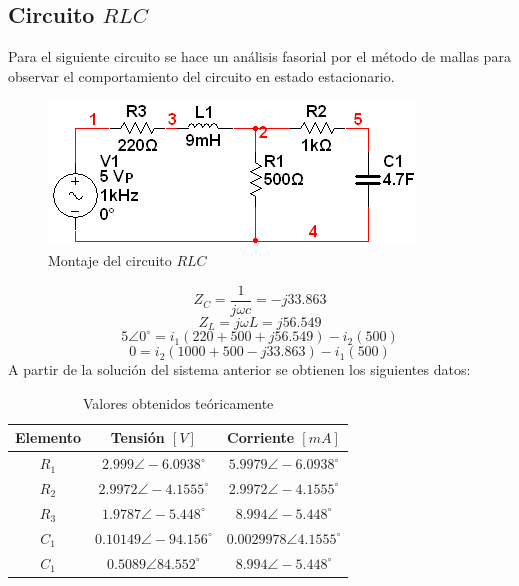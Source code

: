 \documentclass[twocolumn]{IEEEtran}
\begin{document}
\subsection{Circuito $RLC$}
\noindent
Para el siguiente circuito se hace un análisis fasorial por el método de mallas para observar el comportamiento del circuito en estado estacionario.
\begin{figure}[H]
	\centering
		\includegraphics[scale=0.75]{circ3.png}
	\caption{Montaje del circuito $RLC$}
	\label{fig6}
\end{figure}
\begin{equation}
 Z_C = \frac{1}{{j\omega c}} =  - j33.863
\label{ecu7}
\end{equation}
\begin{equation}
 {Z_L} = j\omega L = j56.549
\label{ecu8}
\end{equation}
\begin{equation}
 5\angle 0^\circ  = {i_1}(220 + 500 + j56.549) - {i_2}(500)
\label{ecu9}
\end{equation}
\begin{equation}
 0=i_2 (1000+500-j33.863)-i_1 (500)
\label{ecu10}
\end{equation}
\noindent
A partir de la solución del sistema anterior se obtienen los siguientes datos:
\begin{table}[H]
	\centering
\begin{tabular}[c]{|c|c|c|} \hline
Elemento & Tensión $[V]$ & Corriente $[mA]$ \\ \hline
$R_1$ & $2.999 \angle -6.0938 ^\circ$ & $5.9979 \angle -6.0938^\circ$ \\ \hline
$R_2$ & $2.9972 \angle -4.1555^\circ$ & $2.9972 \angle -4.1555^\circ$ \\ \hline
$R_3$ & $1.9787 \angle -5.448^\circ$ & $8.994 \angle -5.448^\circ$ \\ \hline
$C_1$ & $0.10149 \angle -94.156^\circ$ & $0.0029978 \angle 4.1555^\circ$ \\ \hline
$C_1$ & $0.5089 \angle 84.552^\circ$ & $8.994 \angle -5.448^\circ$ \\ \hline
\end{tabular}
	\caption{Valores obtenidos teóricamente}
	\label{tab3}
\end{table}
\end{document}
